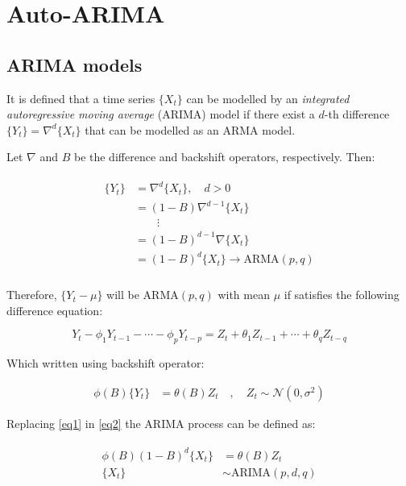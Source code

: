 \pagebreak
\section{Auto-ARIMA}

\subsection{ARIMA models}

It is defined that a time series $\{X_t\}$ can be modelled by an \emph{integrated autoregressive moving average} (ARIMA) model if there exist a $d$-th difference $\{Y_t\} = \nabla^d \{X_t\}$ that can be modelled as an ARMA model\cite{brockwell2016introduction}. 

Let $\nabla$ and $B$ be the difference and backshift operators, respectively. Then:

\begin{align}\label{eq1}
	\begin{split}
		\{Y_t\} &= \nabla^d \{X_t\}, \quad d>0 \\
				&= (1-B)\nabla^{d-1}\{X_t\} \\
				& \quad\quad \vdots \\
				&= (1-B)^{d-1}\nabla\{X_t\} \\
				&= (1-B)^d \{X_t\} \longrightarrow \text{ARMA}(p,q) \\
	\end{split}
\end{align}

Therefore, $\{Y_t - \mu\}$ will be $\text{ARMA}(p,q)$ with mean $\mu$ if satisfies the following difference equation:

\begin{equation*}
	Y_t - \phi_1Y_{t-1} - \cdots - \phi_pY_{t-p} = Z_t + \theta_1Z_{t-1} + \cdots + \theta_qZ_{t-q}
\end{equation*}

Which written using backshift operator:

\begin{align}\label{eq2}
	\phi(B)\{Y_t\} &= \theta(B) Z_t \quad,\quad Z_t \sim \mathcal{N}(0,\sigma^2)
\end{align}

Replacing \ref{eq1} in \ref{eq2} the ARIMA process can be defined as:

\begin{align}\label{eq:arima}
	\begin{split}
		\phi(B)(1-B)^d \{X_t\} &= \theta(B) Z_t \\
		\{X_t\} &\sim \text{ARIMA}(p,d,q)
	\end{split}
\end{align}


